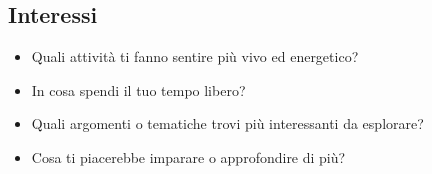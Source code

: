 \documentclass[12pt,a4paper]{article}
\begin{document}
\subsection{Interessi}
\begin{itemize}
  \item Quali attività ti fanno sentire più vivo ed energetico?
  \item In cosa spendi il tuo tempo libero?
  \item Quali argomenti o tematiche trovi più interessanti da esplorare?
  \item Cosa ti piacerebbe imparare o approfondire di più?
\end{itemize}
\subsection{}
\end{document}
